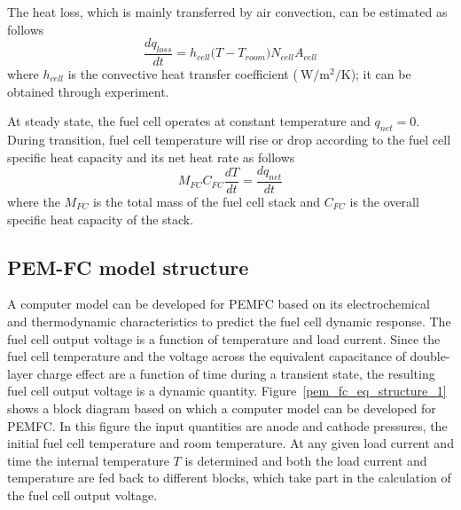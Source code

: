 \documentclass[12pt,a4paper]{scrartcl}
\begin{document}
\begin{onehalfspace}
\begin{enumerate}
The heat loss, which is mainly transferred by air convection, can be estimated as follows
\begin{equation}\label{eq43}
	\frac{dq_{loss}}{dt} = h_{cell}\Big(T-T_{room}\Big)N_{cell}A_{cell}
\end{equation}
where $h_{cell}$ is the convective heat transfer coefficient ($\SI{}{\watt\per\square\meter\per\kelvin}$); it can be obtained through experiment.

At steady state, the fuel cell operates at constant temperature and $q_{net}=0$. During transition, fuel cell temperature will rise or drop according to the fuel cell specific heat capacity and its net heat rate as follows
\begin{equation}\label{eq44}
	M_{FC}C_{FC}\frac{dT}{dt}=\frac{dq_{net}}{dt}
\end{equation}
where the $M_{FC}$ is the total mass of the fuel cell stack and $C_{FC}$ is the overall specific heat capacity of the stack.
\end{enumerate}

\subsection{PEM-FC model structure}
A computer model can be developed for PEMFC based on its electrochemical and thermodynamic characteristics to predict the fuel cell dynamic response. The fuel cell output voltage is a function of temperature and load current. Since the fuel cell temperature and the voltage across the equivalent capacitance of double-layer charge effect are a function of time during a transient state, the resulting fuel cell output voltage is a dynamic quantity. Figure~\ref{pem_fc_eq_structure_1} shows a block diagram based on which a computer model can be developed for PEMFC. In this figure the input quantities are anode and cathode pressures, the initial fuel cell temperature and room temperature. At any given load current and time the internal temperature $T$ is determined and both the load current and temperature are fed back to different blocks, which take part in the calculation of the fuel cell output voltage.


\end{onehalfspace}
\end{document}
